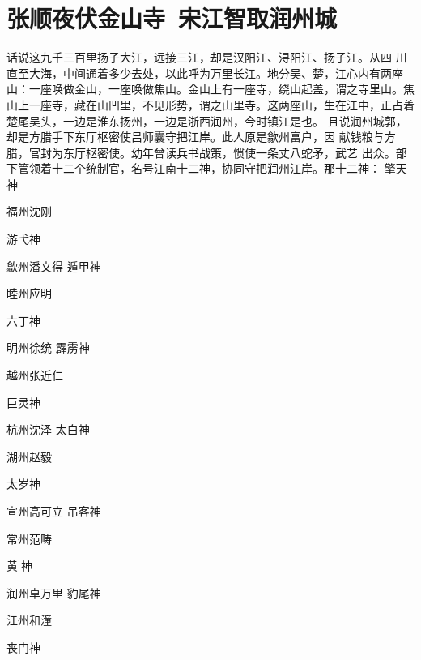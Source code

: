 \chapter{张顺夜伏金山寺~宋江智取润州城}

话说这九千三百里扬子大江，远接三江，却是汉阳江、浔阳江、扬子江。从四
川直至大海，中间通着多少去处，以此呼为万里长江。地分吴、楚，江心内有两座
山：一座唤做金山，一座唤做焦山。金山上有一座寺，绕山起盖，谓之寺里山。焦
山上一座寺，藏在山凹里，不见形势，谓之山里寺。这两座山，生在江中，正占着
楚尾吴头，一边是淮东扬州，一边是浙西润州，今时镇江是也。
且说润州城郭，却是方腊手下东厅枢密使吕师囊守把江岸。此人原是歙州富户，因
献钱粮与方腊，官封为东厅枢密使。幼年曾读兵书战策，惯使一条丈八蛇矛，武艺
出众。部下管领着十二个统制官，名号江南十二神，协同守把润州江岸。那十二神：
擎天神

福州沈刚

游弋神

歙州潘文得
遁甲神

睦州应明

六丁神

明州徐统
霹雳神

越州张近仁

巨灵神

杭州沈泽
太白神

湖州赵毅

太岁神

宣州高可立
吊客神

常州范畴

黄神

润州卓万里
豹尾神

江州和潼

丧门神

